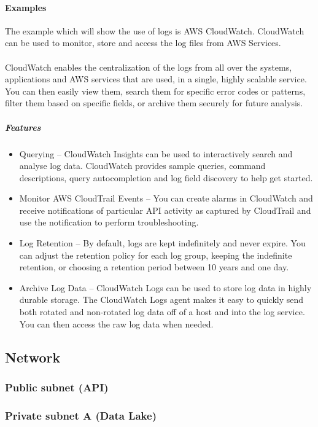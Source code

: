 \documentclass[10pt]{article}
\begin{document}
\paragraph{Examples}
The example which will show the use of logs is AWS CloudWatch. CloudWatch can be used to monitor, store and access the log files from AWS Services.
\\ \\
CloudWatch enables the centralization of the logs from all over the systems, applications and AWS services that are used, in a single, highly scalable service. You can then easily view them, search them for specific error codes or patterns, filter them based on specific fields, or archive them securely for future analysis. \cite{aws-cloudwatch}
\subparagraph{Features}
\begin{itemize}
	\item Querying – CloudWatch Insights can be used to interactively search and analyse log data. CloudWatch provides sample queries, command descriptions, query autocompletion and log field discovery to help get started. 
	\item Monitor AWS CloudTrail Events – You can create alarms in CloudWatch and receive notifications of particular API activity as captured by CloudTrail and use the notification to perform troubleshooting.
	\item Log Retention – By default, logs are kept indefinitely and never expire. You can adjust the retention policy for each log group, keeping the indefinite retention, or choosing a retention period between 10 years and one day.
	\item Archive Log Data – CloudWatch Logs can be used to store log data in highly durable storage. The CloudWatch Logs agent makes it easy to quickly send both rotated and non-rotated log data off of a host and into the log service. You can then access the raw log data when needed.
\end{itemize}

\subsection{Network}
\subsubsection{Public subnet (API)}
\subsubsection{Private subnet A (Data Lake)}
\end{document}
